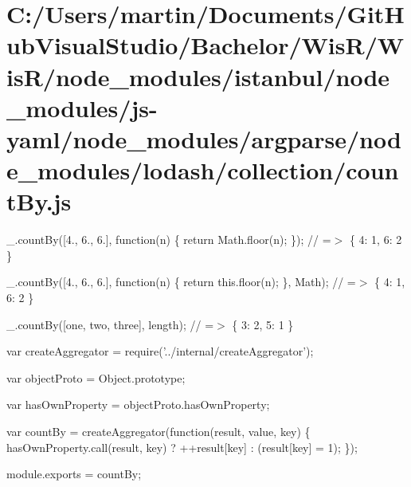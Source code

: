 \hypertarget{_c_1_2_users_2martin_2_documents_2_git_hub_visual_studio_2_bachelor_2_wis_r_2_wis_r_2node_moduleb64750884b26bd9462a60018f29d0998}{}\section{C\+:/\+Users/martin/\+Documents/\+Git\+Hub\+Visual\+Studio/\+Bachelor/\+Wis\+R/\+Wis\+R/node\+\_\+modules/istanbul/node\+\_\+modules/js-\/yaml/node\+\_\+modules/argparse/node\+\_\+modules/lodash/collection/count\+By.\+js}
\+\_\+.\+count\+By(\mbox{[}4., 6., 6.\mbox{]}, function(n) \{ return Math.\+floor(n); \}); // =$>$ \{ \textquotesingle{}4\textquotesingle{}\+: 1, \textquotesingle{}6\textquotesingle{}\+: 2 \}

\+\_\+.\+count\+By(\mbox{[}4., 6., 6.\mbox{]}, function(n) \{ return this.\+floor(n); \}, Math); // =$>$ \{ \textquotesingle{}4\textquotesingle{}\+: 1, \textquotesingle{}6\textquotesingle{}\+: 2 \}

\+\_\+.\+count\+By(\mbox{[}\textquotesingle{}one\textquotesingle{}, \textquotesingle{}two\textquotesingle{}, \textquotesingle{}three\textquotesingle{}\mbox{]}, \textquotesingle{}length\textquotesingle{}); // =$>$ \{ \textquotesingle{}3\textquotesingle{}\+: 2, \textquotesingle{}5\textquotesingle{}\+: 1 \}


\begin{DoxyCodeInclude}
var createAggregator = require(\textcolor{stringliteral}{'../internal/createAggregator'});

var objectProto = Object.prototype;

var hasOwnProperty = objectProto.hasOwnProperty;

var countBy = createAggregator(\textcolor{keyword}{function}(result, value, key) \{
  hasOwnProperty.call(result, key) ? ++result[key] : (result[key] = 1);
\});

module.exports = countBy;
\end{DoxyCodeInclude}
 